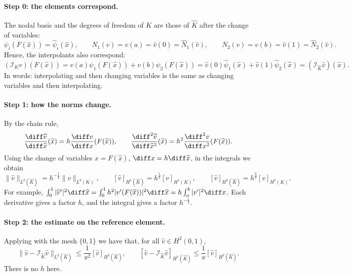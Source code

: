 \paragraph{Step 0: the elements correspond.}
The nodal basis and the degrees of freedom of $K$ are those of $\widehat K$ after the change of variables:
\begin{equation*}
    \psi_i (F(\widehat x)) = \widehat \psi_i (\widehat x),
    \qquad
    N_1(v) = v(a) = \widehat v (0) = \widehat N_1 (\widehat v),
    \qquad
    N_2(v) = v(b) = \widehat v (1) = \widehat N_2 (\widehat v).
\end{equation*}
Hence, the interpolants also correspond:
\begin{equation}
    \label{eq:FEM interpolant commutes d=1}
    (\mathcal I_K v) (F(\widehat x)) = v(a) \psi_1(F(\widehat x)) + v(b) \psi_2(F(\widehat x)) = \widehat v(0) \widehat \psi_1(\widehat x) + \widehat v(1) \widehat \psi_2(\widehat x) = (\mathcal I_{\widehat K} \widehat v) (\widehat x).
\end{equation}
In words: interpolating and then changing variables is the same as changing variables and then interpolating.

\paragraph{Step 1: how the norms change.}
By the chain rule,
\begin{equation*}
    \frac{\diff \widehat v}{\diff \widehat x} (\widehat x) = h \frac{\diff v}{\diff x} (F(\widehat x)),
    \qquad
    \frac{\diff^2 \widehat v}{\diff \widehat x^2} (\widehat x) = h^2 \frac{\diff^2 v}{\diff x^2} (F(\widehat x)).
\end{equation*}
Using the change of variables $x = F(\widehat x)$, $\diff x = h \diff \widehat x$, in the integrals we obtain
\begin{equation}
    \label{eq:FEM scaling d=1}
    \| \widehat v \|_{L^2(\widehat K)} = h^{-\frac 1 2} \| v \|_{L^2(K)},
    \qquad
    [ \widehat v ]_{H^1(\widehat K)} = h^{\frac 1 2} [ v ]_{H^1(K)},
    \qquad
    [ \widehat v ]_{H^2(\widehat K)} = h^{\frac 3 2} [ v ]_{H^2(K)}.
\end{equation}
For example, $\int_0^1 |\widehat v'|^2 \diff \widehat x = \int_0^1 h^2 |v'(F(\widehat x))|^2 \diff \widehat x = h \int_a^b |v'|^2 \diff x$.
Each derivative gives a factor $h$, and the integral gives a factor $h^{-\frac 1 2}$.

\paragraph{Step 2: the estimate on the reference element.}
Applying  with the mesh $\{0, 1\}$ we have that, for all $\widehat v \in H^2(0,1)$,
\begin{equation}
    \label{eq:FEM reference estimate d=1}
    \| \widehat v - \mathcal I_{\widehat K} \widehat v \|_{L^2(\widehat K)} \le \frac{1}{\pi^2} [ \widehat v ]_{H^2(\widehat K)},
    \qquad
    [ \widehat v - \mathcal I_{\widehat K} \widehat v ]_{H^1(\widehat K)} \le \frac{1}{\pi} [ \widehat v ]_{H^2(\widehat K)}.
\end{equation}
There is no $h$ here.

